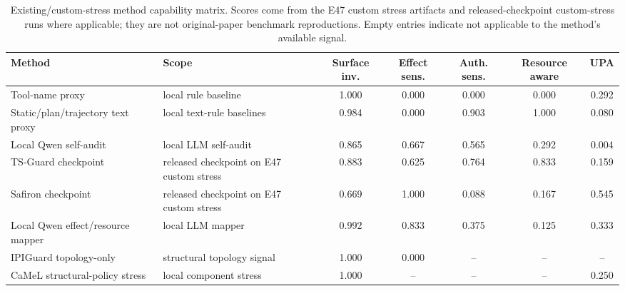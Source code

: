 \begin{table}[t]
\centering
\scriptsize
\caption{Existing/custom-stress method capability matrix. Scores come from the E47 custom stress artifacts and released-checkpoint custom-stress runs where applicable; they are not original-paper benchmark reproductions. Empty entries indicate not applicable to the method's available signal.}
\label{tab:existing-methods}
\begin{tabularx}{\textwidth}{>{\raggedright\arraybackslash}X >{\raggedright\arraybackslash}X c c c c c}
\toprule
Method & Scope & Surface inv. & Effect sens. & Auth. sens. & Resource aware & UPA \\
\midrule
Tool-name proxy & local rule baseline & 1.000 & 0.000 & 0.000 & 0.000 & 0.292 \\
Static/plan/trajectory text proxy & local text-rule baselines & 0.984 & 0.000 & 0.903 & 1.000 & 0.080 \\
Local Qwen self-audit & local LLM self-audit & 0.865 & 0.667 & 0.565 & 0.292 & 0.004 \\
TS-Guard checkpoint & released checkpoint on E47 custom stress & 0.883 & 0.625 & 0.764 & 0.833 & 0.159 \\
Safiron checkpoint & released checkpoint on E47 custom stress & 0.669 & 1.000 & 0.088 & 0.167 & 0.545 \\
Local Qwen effect/resource mapper & local LLM mapper & 0.992 & 0.833 & 0.375 & 0.125 & 0.333 \\
IPIGuard topology-only & structural topology signal & 1.000 & 0.000 & -- & -- & -- \\
CaMeL structural-policy stress & local component stress & 1.000 & -- & -- & -- & 0.250 \\
\bottomrule
\end{tabularx}
\end{table}
